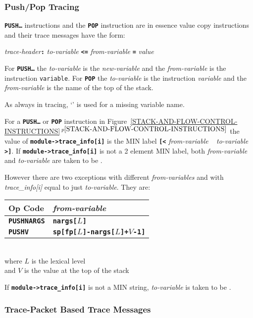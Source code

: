 \documentclass[12pt]{article}
\newcommand{\TT}[1]{{\tt \bfseries #1}}
\newcommand{\itemref}[1]{\ref{#1}$\,^{p\pageref{#1}}$}
\newcommand{\EOL}{\penalty \exhyphenpenalty}
\begin{document}
\subsubsection{Push/Pop Tracing}
\label{PUSH/POP-TRACING}

\TT{PUSH\ldots} instructions and the \TT{POP} instruction are in essence
value copy instructions and their trace messages
have the form:

\begin{center}
{\em trace-header}\TT{:} {\em to-variable}
                    \TT{<=} {\em from-variable} \TT{=} {\em value}
\end{center}

For \TT{PUSH\ldots} the {\em to-variable} is the {\em new-variable}
and the {\em from-variable} is the instruction {\tt variable}.
For \TT{POP} the {\em to-variable} is the instruction {\em variable}
and the {\em from-variable} is the name of the top of the stack.

As always in tracing, `\TT{*}' is used for a missing variable name.

For a \TT{PUSH\ldots} or \TT{POP} instruction
in Figure~\itemref{STACK-AND-FLOW-CONTROL-INSTRUCTIONS}
the value of
\TT{module->\EOL trace\_\EOL info[i]} is the MIN label
\TT{[<} {\em from-variable} ~ {\em to-variable} \TT{>]}.
If \TT{module->\EOL trace\_\EOL info[i]} is not a 2 element MIN label,
both {\em from-variable} and {\em to-variable} are taken to be \TT{*}.

However there are two exceptions with different {\em from-variables}
and with {\em trace\_\EOL info[i]} equal to just {\em to-variable}.
They are:
\begin{center}
\begin{tabular}{l@{~~~~~}l}
\bf Op Code & \bf \em from-variable
\\\hline
\TT{PUSHNARGS} & \TT{nargs[$L$]} \\
\TT{PUSHV}     & \TT{sp[fp[$L$]-nargs[$L$]+$V$-1]}
\end{tabular}
\\[1ex]
where $L$ is the lexical level \\
and $V$ is the value at the top of the stack
\end{center}
If \TT{module->\EOL trace\_\EOL info[i]} is not a MIN string,
{\em to-variable} is taken to be \TT{*}.


\subsubsection{Trace-Packet Based Trace Messages}
\label{TRACE-PACKET-BASED-TRACE-MESSAGES}
\end{document}
